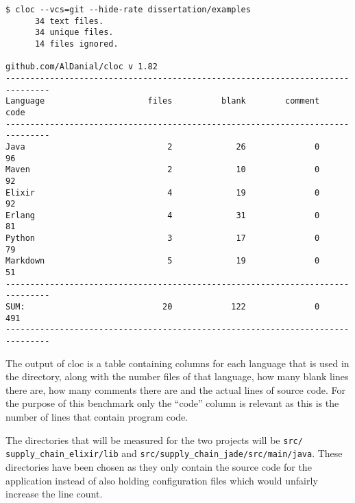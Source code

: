 \begin{lstlisting}[numbers=none,float=ht,label=lst:cloc,caption=Output of cloc when run on the example projects]
$ cloc --vcs=git --hide-rate dissertation/examples
      34 text files.
      34 unique files.
      14 files ignored.

github.com/AlDanial/cloc v 1.82
-------------------------------------------------------------------------------
Language                     files          blank        comment           code
-------------------------------------------------------------------------------
Java                             2             26              0             96
Maven                            2             10              0             92
Elixir                           4             19              0             92
Erlang                           4             31              0             81
Python                           3             17              0             79
Markdown                         5             19              0             51
-------------------------------------------------------------------------------
SUM:                            20            122              0            491
-------------------------------------------------------------------------------
\end{lstlisting}

The output of cloc is a table containing columns for each language that is used in the directory, along with the number files of that language, how many blank lines there are, how many comments there are and the actual lines of source code.
For the purpose of this benchmark only the ``code'' column is relevant as this is the number of lines that contain program code.

The directories that will be measured for the two projects will be \verb|src/|\\ \verb|supply_chain_elixir/lib| and \verb|src/supply_chain_jade/src/main/java|.
These directories have been chosen as they only contain the source code for the application instead of also holding configuration files which would unfairly increase the line count.
